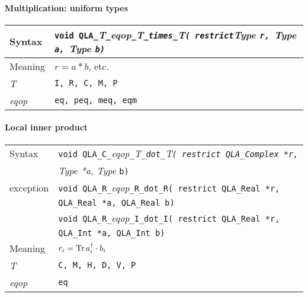 \documentclass{article}
\newcommand{\Tr}{\mathop{\rm Tr}}
\newcommand{\tReal}{QLA\ttdash Real }
\newcommand{\tInt}{QLA\ttdash Int }
\newcommand{\tqlaComplex}{QLA\ttdash Complex }
\newcommand{\namespace}{QLA}
\newcommand{\allEqOps}{{\tt eq, peq, meq, eqm}}
\newcommand{\allComplexTypes}{{\tt C, M, H, D, V, P}}
\newcommand{\ttdash}{{\tt \_}}
\newcommand{\itt}{\it T}
\newcommand{\extraarg}{}
\begin{document}
\paragraph{Multiplication: uniform types}

\begin{flushleft}
  \begin{tabular}{|l|l|}
  \hline
  Syntax      & {\tt void \namespace}\ttdash\itt\ttdash{\it eqop}\ttdash\itt\ttdash{\tt times}\ttdash\itt{\tt ( restrict}{\it Type }{\tt *r, }{\it Type }{\tt *a, }{\it Type }{\tt *b\extraarg)} \\
  \hline
  Meaning     & $r = a * b$, etc. \\
  \hline
  \itt        & {\tt I, R, C, M, P} \\
  \hline
  {\it eqop}  & \allEqOps \\
  \hline
  \end{tabular}
\end{flushleft}

\paragraph{Local inner product}

\begin{flushleft}
  \begin{tabular}{|l|l|}
  \hline
  Syntax      & {\tt void \namespace}\ttdash{\tt C}\ttdash{\it eqop}\ttdash\itt\ttdash{\tt dot}\ttdash\itt{\tt ( restrict \tqlaComplex *r, }\\
              & {\it Type *a, }{\it Type }{\tt *b\extraarg)} \\
  exception   & {\tt void \namespace}\ttdash{\tt R}\ttdash{\it eqop}\ttdash{\tt R}\ttdash{\tt dot}\ttdash{\tt R}{\tt ( restrict \tReal *r, }\\
              & {\tt \tReal *a, }{\tt \tReal }{\tt *b\extraarg)} \\
              & {\tt void \namespace}\ttdash{\tt R}\ttdash{\it eqop}\ttdash{\tt I}\ttdash{\tt dot}\ttdash{\tt I}{\tt ( restrict \tReal *r, }\\
              & {\tt \tInt *a, }{\tt \tInt }{\tt *b\extraarg)} \\
  \hline
  Meaning     & $r_i = \Tr a^\dagger_i \cdot b_i$ \\
  \hline
  \itt        & \allComplexTypes \\
  \hline
  {\it eqop}  & {\tt eq} \\
  \hline
  \end{tabular}
\end{flushleft}
\end{document}
